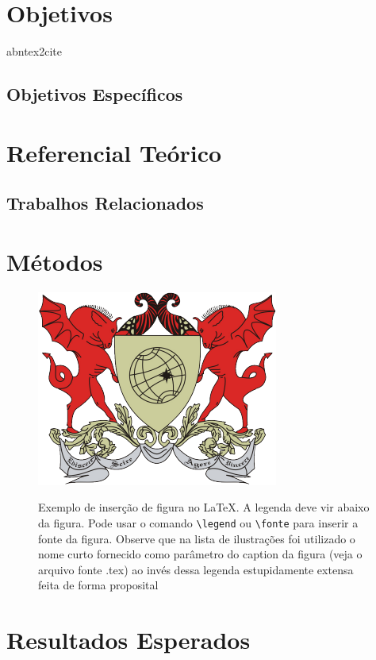 \documentclass[
	12pt,				    %
	openright,			    %
	oneside,			    %
	a4paper,			    %
    sumario=tradicional,    %
	english,			    %
	brazil,				    %
	]{abntex2}
\begin{document}
\chapter{Objetivos}\label{sec:objetivos}abntex2cite

\section{Objetivos Específicos}\label{sec:ObjetivosEspec}

\chapter{Referencial Teórico}\label{sec:RefTeorico}

\section{Trabalhos Relacionados}\label{sec:TrabRel}

\chapter{Métodos}\label{sec:metodos}
\begin{figure}[htbp]
  \begin{center}
  \includegraphics[width=.5\linewidth]{logoufv}\\
  \end{center}
  \caption[Exemplo de Figura]{Exemplo de inserção de figura no \LaTeX. A legenda deve vir abaixo da figura. Pode usar o comando \texttt{\textbackslash legend} ou \texttt{\textbackslash fonte} para inserir a fonte da figura. Observe que na lista de ilustrações foi utilizado o nome curto fornecido como parâmetro do caption da figura (veja o arquivo fonte .tex) ao invés dessa legenda estupidamente extensa feita de forma proposital}
  \label{fig:logo}
\end{figure}

\chapter{Resultados Esperados}\label{sec:resultEsperados}
\end{document}
